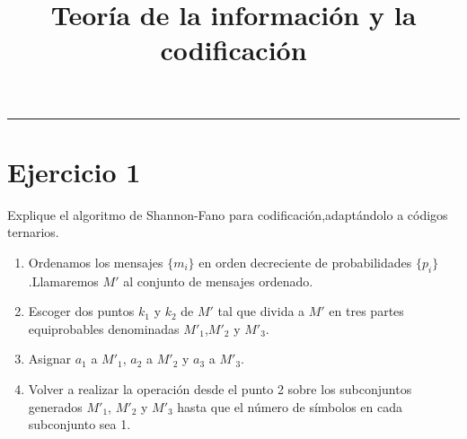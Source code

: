 \documentclass[12pt,a4paper]{article}
\newcommand{\horrule}[1]{\rule{\linewidth}{#1}} %
\begin{document}
	
	\title{Teoría de la información y la codificación}
	
	\maketitle
	\horrule{2pt}
	\section{Ejercicio 1}{Explique el algoritmo de Shannon-Fano para codificación,adaptándolo a códigos ternarios.}
	\begin{enumerate}
		\item Ordenamos los mensajes $\{m_i\}$ en orden decreciente de probabilidades $\{p_i\}$.Llamaremos $M'$ al conjunto de mensajes ordenado.
		\item Escoger dos puntos $k_1$ y $k_2$ de $M'$ tal que divida a $M'$ en tres partes equiprobables denominadas $M'_1$,$M'_2$ y $M'_3$.
		\item Asignar $a_1$ a $M'_1$, $a_2$ a $M'_2$ y $a_3$ a $M'_3$.
		\item Volver a realizar la operación desde el punto 2 sobre los subconjuntos generados $M'_1$, $M'_2$ y $M'_3$ hasta que el número de símbolos en cada subconjunto sea 1.
	\end{enumerate}
\end{document}
